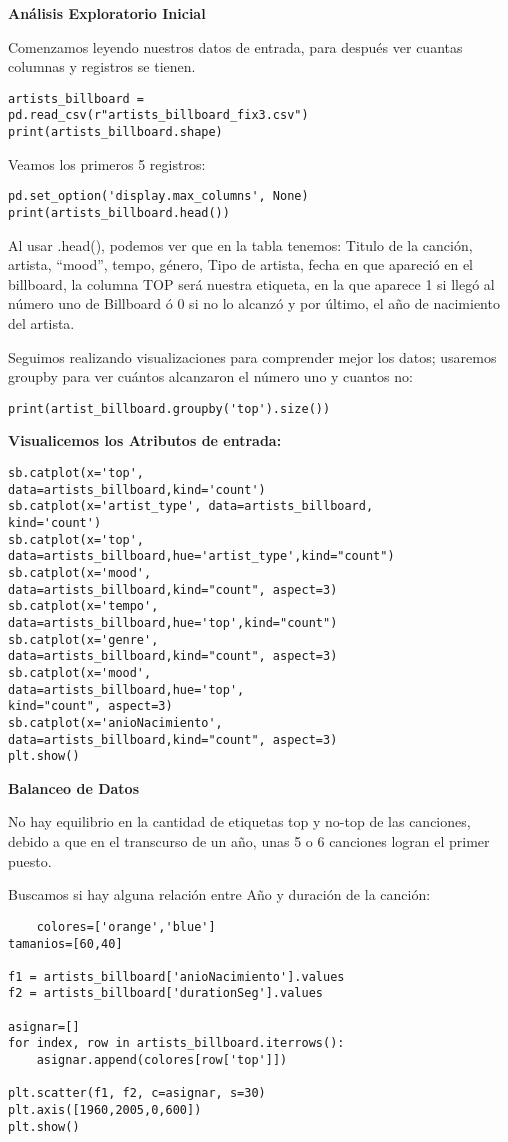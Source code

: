\documentclass{article}
\begin{document}
\textbf{Análisis Exploratorio Inicial}



Comenzamos leyendo nuestros datos de entrada, para después ver cuantas columnas y registros se tienen.
\begin{lstlisting}
artists_billboard = 
pd.read_csv(r"artists_billboard_fix3.csv")
print(artists_billboard.shape) 
\end{lstlisting}

Veamos los primeros 5 registros:
\begin{lstlisting}
pd.set_option('display.max_columns', None)
print(artists_billboard.head())
\end{lstlisting}
Al usar .head(), podemos ver que en la tabla tenemos: Titulo de la canción, artista, ``mood'', tempo, género, Tipo de artista, fecha en que apareció en el billboard, la columna TOP será nuestra etiqueta, en la que aparece 1 si llegó al número uno de Billboard ó 0 si no lo alcanzó y por último, el año de nacimiento del artista.


Seguimos realizando visualizaciones para comprender mejor los datos; usaremos groupby para ver cuántos alcanzaron el número uno y cuantos no:
\begin{lstlisting}
print(artist_billboard.groupby('top').size())
\end{lstlisting}


\textbf{Visualicemos los Atributos de entrada:}



\begin{lstlisting}
sb.catplot(x='top',
data=artists_billboard,kind='count')
sb.catplot(x='artist_type', data=artists_billboard, 
kind='count')
sb.catplot(x='top',
data=artists_billboard,hue='artist_type',kind="count")
sb.catplot(x='mood',
data=artists_billboard,kind="count", aspect=3)
sb.catplot(x='tempo',
data=artists_billboard,hue='top',kind="count")
sb.catplot(x='genre',
data=artists_billboard,kind="count", aspect=3)
sb.catplot(x='mood',
data=artists_billboard,hue='top',
kind="count", aspect=3)
sb.catplot(x='anioNacimiento',
data=artists_billboard,kind="count", aspect=3)
plt.show()
\end{lstlisting}


\textbf{Balanceo de Datos}


No hay equilibrio en la cantidad de etiquetas top y no-top de las canciones, debido a que en el transcurso de un año, unas 5 o 6 canciones logran el primer puesto.

Buscamos si hay alguna relación entre Año y duración de la canción:
\begin{lstlisting}
    colores=['orange','blue']
tamanios=[60,40]

f1 = artists_billboard['anioNacimiento'].values
f2 = artists_billboard['durationSeg'].values

asignar=[]
for index, row in artists_billboard.iterrows():    
    asignar.append(colores[row['top']])

plt.scatter(f1, f2, c=asignar, s=30)
plt.axis([1960,2005,0,600])
plt.show()
\end{lstlisting}
\end{document}
